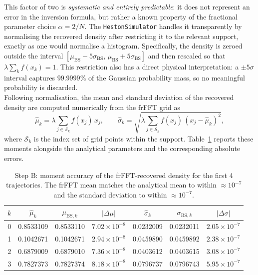This factor of two is \emph{systematic and entirely predictable}: it does
not represent an error in the inversion formula, but rather a known property
of the fractional parameter choice $\alpha = 2/N$.  The \texttt{HestonSimulator}
handles it transparently by normalising the recovered density after
restricting it to the relevant support, exactly as one would normalise a
histogram.  Specifically, the density is zeroed outside the interval
$[\mu_{\mathrm{BS}} - 5\sigma_{\mathrm{BS}},\,
  \mu_{\mathrm{BS}} + 5\sigma_{\mathrm{BS}}]$
and then rescaled so that $\lambda \sum_k f(x_k) = 1$.  This restriction also
has a direct physical interpretation: a $\pm 5\sigma$ interval captures
$99.9999\%$ of the Gaussian probability mass, so no meaningful probability is
discarded.\\

Following normalisation, the mean and standard deviation of the recovered
density are computed numerically from the frFFT grid as
\begin{equation}
    \hat{\mu}_k = \lambda\sum_{j \in \mathcal{S}_k} f(x_j)\,x_j,
    \qquad
    \hat{\sigma}_k = \sqrt{\lambda\sum_{j \in \mathcal{S}_k}
                           f(x_j)\,(x_j - \hat{\mu}_k)^2},
    \label{eq:frfft_moments}
\end{equation}
where $\mathcal{S}_k$ is the index set of grid points within the support.
Table~\ref{tab:step_b} reports these moments alongside the analytical
parameters and the corresponding absolute errors.

\begin{table}[H]
\centering
\caption{Step B: moment accuracy of the frFFT-recovered density for the first 4 trajectories.  The
frFFT mean matches the analytical mean to within $\approx 10^{-7}$ and the
standard deviation to within $\approx 10^{-7}$.}
\label{tab:step_b}
\begin{tabular}{ccccccc}
\toprule
$k$ & $\hat{\mu}_k$ & $\mu_{\mathrm{BS},k}$ & $|\Delta\mu|$
    & $\hat{\sigma}_k$ & $\sigma_{\mathrm{BS},k}$ & $|\Delta\sigma|$ \\
\midrule
0 & 0.8533109 & 0.8533110 & $7.02 \times 10^{-8}$ & 0.0232009 & 0.0232011 & $2.05 \times 10^{-7}$ \\
1 & 0.1042671 & 0.1042671 & $2.94 \times 10^{-8}$ & 0.0459890 & 0.0459892 & $2.38 \times 10^{-7}$ \\
2 & 0.6879009 & 0.6879010 & $7.36 \times 10^{-8}$ & 0.0403612 & 0.0403615 & $3.08 \times 10^{-7}$ \\
3 & 0.7827373 & 0.7827374 & $8.18 \times 10^{-8}$ & 0.0796737 & 0.0796743 & $5.95 \times 10^{-7}$ \\
\bottomrule
\end{tabular}
\end{table}


